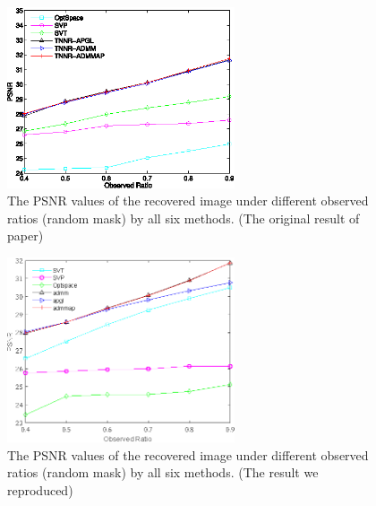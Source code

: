 \documentclass{article}
\begin{document}
{\begin{figure}[htbp]
	\centering
	\includegraphics[width=0.6\textwidth]{./assets/ori-fig5.eps}
	\caption{The PSNR values of the recovered image under different
		observed ratios (random mask) by all six methods. (The original result of paper)}
	\label{fig5ori}
\end{figure}
\begin{figure}[htbp]
	\centering
	\includegraphics[width=0.6\textwidth]{./assets/fig5.eps}
	\caption{The PSNR values of the recovered image under different
		observed ratios (random mask) by all six methods. (The result we reproduced)}
	\label{fig5}
\end{figure}

}
\end{document}
